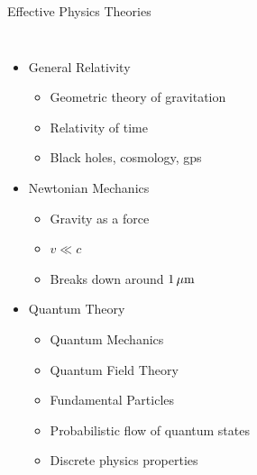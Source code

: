 \documentclass{beamer}
\begin{document}
\begin{frame}{Effective Physics Theories}
\begin{columns}
		\begin{itemize}
			\item<1-> General Relativity
				\begin{itemize}
					\item<2-> Geometric theory of gravitation
					\item<3-> Relativity of time
					\item<4-> Black holes, cosmology, gps
				\end{itemize}
			\item<5-> Newtonian Mechanics
				\begin{itemize}
					\item<6-> Gravity as a force
					\item<7-> $v \ll c$
					\item<8-> Breaks down around $\unit[1]{\mu m}$
				\end{itemize}
			\item<9-> Quantum Theory
				\begin{itemize}
					\item<10-> Quantum Mechanics
					\item<11-> Quantum Field Theory
					\item<12-> Fundamental Particles
					\item<13-> Probabilistic flow of quantum states
					\item<14-> Discrete physics properties
				\end{itemize}
		\end{itemize}

\end{columns}
\end{frame}
\end{document}
